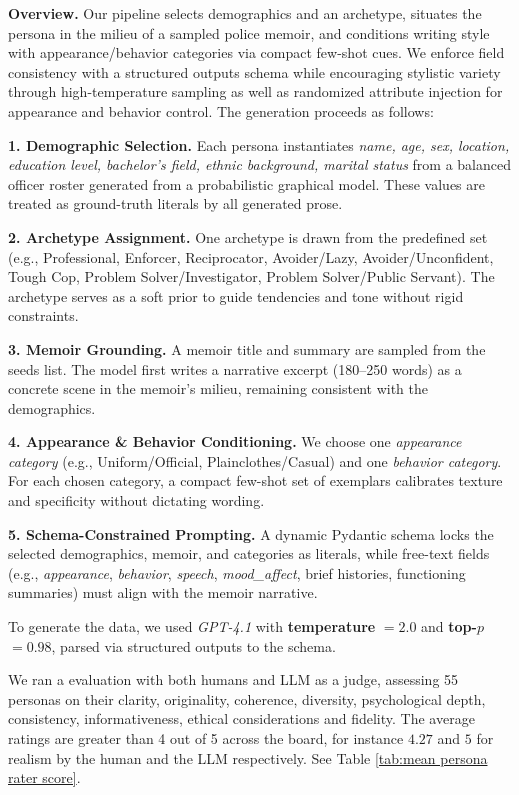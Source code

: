 \documentclass[11pt]{article}
\begin{document}
\noindent \textbf{Overview.} Our pipeline selects demographics and an archetype, situates the persona in the milieu of a sampled police memoir, and conditions writing style with appearance/behavior categories via compact few-shot cues. We enforce field consistency with a structured outputs schema while encouraging stylistic variety through high-temperature sampling as well as randomized attribute injection for appearance and behavior control. The generation proceeds as follows:

 \noindent \textbf{1. Demographic Selection.} Each persona instantiates \emph{name, age, sex, location, education level, bachelor’s field, ethnic background, marital status} from a balanced officer roster generated from a probabilistic graphical model. These values are treated as ground-truth literals by all generated prose.
 
\noindent  \textbf{2. Archetype Assignment.} One archetype is drawn from the predefined set (e.g., Professional, Enforcer, Reciprocator, Avoider/Lazy, Avoider/Unconfident, Tough Cop, Problem Solver/Investigator, Problem Solver/Public Servant). The archetype serves as a soft prior to guide tendencies and tone without rigid constraints.

\noindent  \textbf{3. Memoir Grounding.} A memoir title and summary are sampled from the seeds list. The model first writes a narrative excerpt (180--250 words) as a concrete scene in the memoir’s milieu, remaining consistent with the demographics.

\noindent  \textbf{4. Appearance \& Behavior Conditioning.} We choose one \emph{appearance category} (e.g., Uniform/Official, 
Plainclothes/Casual) and one \emph{behavior category}. For each chosen category, a compact few-shot set of exemplars calibrates texture and specificity without dictating wording.

\noindent  \textbf{5. Schema-Constrained Prompting.} A dynamic Pydantic schema locks the selected demographics, memoir, and categories as literals, while free-text fields (e.g., \emph{appearance}, \emph{behavior}, \emph{speech}, \emph{mood\_affect}, brief histories, functioning summaries) must align with the memoir narrative.

To generate the data, we used \emph{GPT-4.1} \citep{openai2024gpt4technicalreport} with \textbf{temperature} $=2.0$ and \textbf{top-$p$} $=0.98$, parsed via structured outputs to the schema.

We ran a evaluation with both humans and LLM as a judge, assessing 55 personas on their clarity, originality, coherence, diversity, psychological depth, consistency, informativeness, ethical considerations and fidelity.  The average ratings are greater than 4 out of 5 across the board, for instance $4.27$ and $5$ for realism by the human and the LLM respectively. See Table \ref{tab:mean persona rater score}. 
\end{document}
